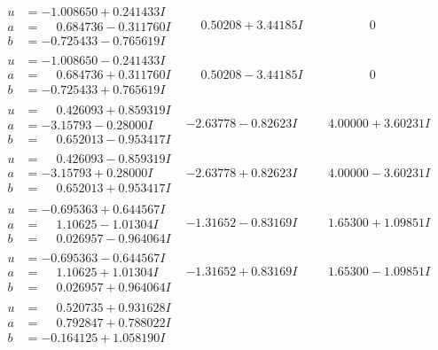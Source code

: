 \documentclass[1p]{elsarticle_modified}
\theoremstyle{definition}
\begin{document}
$$\begin{array}{c|c|c}
\begin{aligned}
u &= -1.008650 + 0.241433 I \\
a &= \phantom{-}0.684736 - 0.311760 I \\
b &= -0.725433 - 0.765619 I\end{aligned}
 & \phantom{-}0.50208 + 3.44185 I & \phantom{-0.000000 } 0 \\ \hline\begin{aligned}
u &= -1.008650 - 0.241433 I \\
a &= \phantom{-}0.684736 + 0.311760 I \\
b &= -0.725433 + 0.765619 I\end{aligned}
 & \phantom{-}0.50208 - 3.44185 I & \phantom{-0.000000 } 0 \\ \hline\begin{aligned}
u &= \phantom{-}0.426093 + 0.859319 I \\
a &= -3.15793 - 0.28000 I \\
b &= \phantom{-}0.652013 - 0.953417 I\end{aligned}
 & -2.63778 - 0.82623 I & \phantom{-}4.00000 + 3.60231 I \\ \hline\begin{aligned}
u &= \phantom{-}0.426093 - 0.859319 I \\
a &= -3.15793 + 0.28000 I \\
b &= \phantom{-}0.652013 + 0.953417 I\end{aligned}
 & -2.63778 + 0.82623 I & \phantom{-}4.00000 - 3.60231 I \\ \hline\begin{aligned}
u &= -0.695363 + 0.644567 I \\
a &= \phantom{-}1.10625 - 1.01304 I \\
b &= \phantom{-}0.026957 - 0.964064 I\end{aligned}
 & -1.31652 - 0.83169 I & \phantom{-}1.65300 + 1.09851 I \\ \hline\begin{aligned}
u &= -0.695363 - 0.644567 I \\
a &= \phantom{-}1.10625 + 1.01304 I \\
b &= \phantom{-}0.026957 + 0.964064 I\end{aligned}
 & -1.31652 + 0.83169 I & \phantom{-}1.65300 - 1.09851 I \\ \hline\begin{aligned}
u &= \phantom{-}0.520735 + 0.931628 I \\
a &= \phantom{-}0.792847 + 0.788022 I \\
b &= -0.164125 + 1.058190 I\end{aligned}

\end{array}$$
\end{document}
